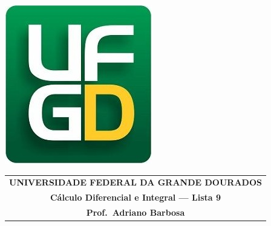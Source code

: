 \documentclass[a4paper,5pt]{amsbook}
\begin{document}
\thispagestyle{empty}
\pagestyle{empty}
\begin{minipage}[h]{0.14\textwidth}
	\includegraphics[scale=0.24]{../ufgd.png}
\end{minipage}
\begin{minipage}[h]{\textwidth}
\begin{tabular}{c}
{{\bf UNIVERSIDADE FEDERAL DA GRANDE DOURADOS}}\\
{{\bf C\'alculo Diferencial e Integral --- Lista 9}}\\
{{\bf Prof.\ Adriano Barbosa}}\\
\end{tabular}
\vspace{-0.45cm}
%
\end{minipage}

\end{document}
